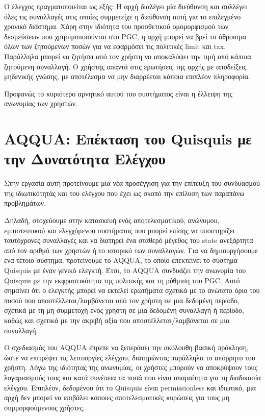 Ο έλεγχος πραγματοποιείται ως εξής: Η αρχή διαλέγει μία διεύθυνση και συλλέγει όλες τις συναλλαγές στις οποίες συμμετείχε η διεύθυνση αυτή για το επιλεγμένο χρονικό διάστημα. Χάρη στην ιδιότητα του προσθετικού ομομορφισμού των δεσμεύσεων που χρησιμοποιούνται στο PGC, η αρχή μπορεί να βρεί το άθροισμα όλων των ζητούμενων ποσών για να εφαρμόσει τις πολιτικές limit και tax. Παράλληλα μπορεί να ζητήσει από τον χρήστη να αποκαλύψει την τιμή από κάποια ζητούμενη συναλλαγή. Ο χρήστης απαντά στις ερωτήσεις της αρχής με αποδείξεις μηδενικής γνώσης, με αποτέλεσμα να μην διαρρέεται κάποια επιπλέον πληροφορία.

Προφανώς το κυριότερο αρνητικό αυτού του συστήματος είναι η έλλειψη της ανωνυμίας των χρηστών.


\section{AQQUA: Επέκταση του Quisquis με την Δυνατότητα Ελέγχου}

Στην εργασία αυτή προτείνουμε μία νέα προσέγγιση για την επίτευξη του συνδυασμού της ιδιωτικότητάς και του ελέγχου που έχει ως σκοπό την επίλυση των παραπάνω προβλημάτων.

Δηλαδή, στοχεύουμε στην κατασκευή ενός αποτελεσματικού, ανώνυμου, εμπιστευτικού και ελεγχόμενου συστήματος που μπορεί επίσης να υποστηρίζει ταυτόχρονες συναλλαγές και να διατηρεί ένα σταθερό μέγεθος του state ανεξάρτητα από τον αριθμό των χρηστών ή το ιστορικό των συναλλαγών. Για να δημιουργήσουμε ένα τέτοιο σύστημα, προτείνουμε το AQQUA, το οποίο επεκτείνει το σύστημα Quisquis με έναν γενικό ελεγκτή. Έτσι, το AQQUA συνδυάζει την ανωνυμία του Quisquis με την εκφραστικότητα της πολιτικής και τη ρύθμιση του PGC. Αυτό σημαίνει ότι ο ελεγκτής μπορεί να εκτελεί ερωτήματα σχετικά με το ανώτατο όριο του ποσού που αποστέλλεται/λαμβάνεται από τον χρήστη σε μια δεδομένη περίοδο, σχετικά με τη μη συμμετοχή ενός χρήστη σε μια δεδομένη συναλλαγή ή περίοδο, καθώς και σχετικά με την ακριβή αξία που αποστέλλεται/λαμβάνεται σε μια συναλλαγή.

Ο σχεδιασμός του AQQUA έπρεπε να ξεπεράσει την ακόλουθη βασική πρόκληση, ώστε να επιτρέψει τις λειτουργίες ελέγχου, διατηρώντας παράλληλα το απόρρητο του χρήστη. Λόγω της ιδιότητας της ανωνυμίας, οι χρήστες μπορούν να αποκρύψουν τους λογαριασμούς τους και κατά συνέπεια τα ποσά που είναι απαραίτητα για τη διαδικασία ελέγχου. Επιπλέον, δεδομένου ότι το Quisquis είναι permissionless και ιδιωτικό, μια αρχή δεν μπορεί να επιβάλει κάποιες αποτελεσματικές κυρώσεις για τους μη συμμορφούμενους χρήστες.

